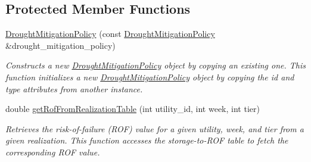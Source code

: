 \subsection*{Protected Member Functions}
\begin{DoxyCompactItemize}
\item 
\mbox{\hyperlink{classDroughtMitigationPolicy_aaf0715876ce33a75c7db92e50523ea0c}{Drought\+Mitigation\+Policy}} (const \mbox{\hyperlink{classDroughtMitigationPolicy}{Drought\+Mitigation\+Policy}} \&drought\+\_\+mitigation\+\_\+policy)
\begin{DoxyCompactList}\small\item\em Constructs a new \mbox{\hyperlink{classDroughtMitigationPolicy}{Drought\+Mitigation\+Policy}} object by copying an existing one. This function initializes a new \mbox{\hyperlink{classDroughtMitigationPolicy}{Drought\+Mitigation\+Policy}} object by copying the {\ttfamily id} and {\ttfamily type} attributes from another instance. \end{DoxyCompactList}\item 
double \mbox{\hyperlink{classDroughtMitigationPolicy_a685ce7eacb01cb262d7e5245a736aa38}{get\+Rof\+From\+Realization\+Table}} (int utility\+\_\+id, int week, int tier)
\begin{DoxyCompactList}\small\item\em Retrieves the risk-\/of-\/failure (R\+OF) value for a given utility, week, and tier from a given realization. This function accesses the storage-\/to-\/\+R\+OF table to fetch the corresponding R\+OF value. \end{DoxyCompactList}\end{DoxyCompactItemize}
